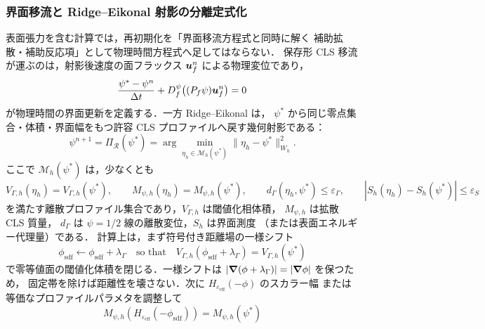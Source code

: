 \subsubsection{界面移流と Ridge--Eikonal 射影の分離定式化}
\label{sec:transport_reinit_projection_split}

表面張力を含む計算では，再初期化を「界面移流方程式と同時に解く
補助拡散・補助反応項」として物理時間方程式へ足してはならない．
保存形 CLS 移流が運ぶのは，射影後速度の面フラックス
$\bm{u}_f^n$ による物理変位であり，
\begin{equation}
  \frac{\psi^\ast-\psi^n}{\Delta t}
  +D_f^\psi\!\left((P_f\psi)\bm{u}_f^n\right)=0
  \label{eq:transport_reinit_physical_transport}
\end{equation}
が物理時間の界面更新を定義する．一方 Ridge--Eikonal は，
$\psi^\ast$ から同じ零点集合・体積・界面幅をもつ許容
CLS プロファイルへ戻す幾何射影である：
\begin{equation}
  \psi^{n+1}
  =
  \Pi_{\mathcal{R}}(\psi^\ast)
  =
  \arg\min_{\eta_h\in\mathcal{M}_h(\psi^\ast)}
  \|\eta_h-\psi^\ast\|_{W_h}^2 .
  \label{eq:ridge_eikonal_projection_map}
\end{equation}
ここで $\mathcal{M}_h(\psi^\ast)$ は，少なくとも
\begin{equation}
  V_{\Gamma,h}(\eta_h)=V_{\Gamma,h}(\psi^\ast),\qquad
  M_{\psi,h}(\eta_h)=M_{\psi,h}(\psi^\ast),\qquad
  d_\Gamma\!\left(\eta_h,\psi^\ast\right)\le\varepsilon_\Gamma,\qquad
  |S_h(\eta_h)-S_h(\psi^\ast)|\le\varepsilon_S
  \label{eq:ridge_eikonal_projection_constraints}
\end{equation}
を満たす離散プロファイル集合であり，$V_{\Gamma,h}$ は閾値化相体積，
$M_{\psi,h}$ は拡散 CLS 質量，
$d_\Gamma$ は $\psi=1/2$ 線の離散変位，$S_h$ は界面測度
（または表面エネルギー代理量）である．
計算上は，まず符号付き距離場の一様シフト
\begin{equation}
  \phi_{\mathrm{sdf}}\leftarrow\phi_{\mathrm{sdf}}+\lambda_\Gamma
  \quad\text{so that}\quad
  V_{\Gamma,h}(\phi_{\mathrm{sdf}}+\lambda_\Gamma)
  =V_{\Gamma,h}(\psi^\ast)
  \label{eq:ridge_eikonal_sharp_volume_shift}
\end{equation}
で零等値面の閾値化体積を閉じる．一様シフトは
$|\bm{\nabla}(\phi+\lambda_\Gamma)|=|\bm{\nabla}\phi|$ を保つため，
固定帯を除けば距離性を壊さない．次に
$H_{\varepsilon_{\mathrm{eff}}}(-\phi)$ のスカラー幅
または等価なプロファイルパラメタを調整して
\begin{equation}
  M_{\psi,h}\!\left(H_{\varepsilon_{\mathrm{eff}}}(-\phi_{\mathrm{sdf}})\right)
  =
  M_{\psi,h}(\psi^\ast)
  \label{eq:ridge_eikonal_diffuse_mass_width}
\end{equation}
